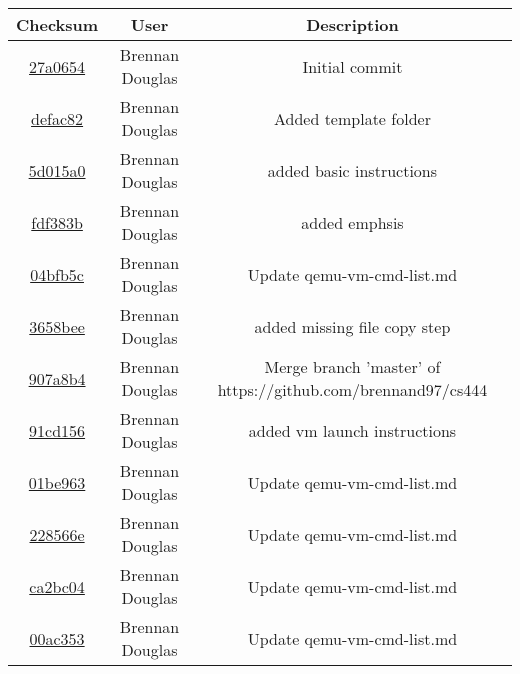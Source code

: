 \documentclass[onecolumn, draftclsnofoot,10pt, compsoc]{IEEEtran}
\begin{document}
\begin{center}
	\begin{tabular}{ |c|c|c| }
		\hline
		Checksum & User & Description \\
		\hline
        \href{https://github.com/brennand97/CS444/commit/27a06542de23be17ce0aa5bc488a6bfc0dfacba1}{27a0654} & Brennan Douglas & Initial commit\\\hline
        \href{https://github.com/brennand97/CS444/commit/defac8295b6c858a8aea01745b131ef72420058c}{defac82} & Brennan Douglas & Added template folder\\\hline
        \href{https://github.com/brennand97/CS444/commit/5d015a0995505a9367288dd4cb9d1210ec628a3e}{5d015a0} & Brennan Douglas & added basic instructions\\\hline
        \href{https://github.com/brennand97/CS444/commit/fdf383b95856bc4299a44382daf9eee220e9e109}{fdf383b} & Brennan Douglas & added emphsis\\\hline
        \href{https://github.com/brennand97/CS444/commit/04bfb5cc337bb7c092347bda650cce85dcae9182}{04bfb5c} & Brennan Douglas & Update qemu-vm-cmd-list.md\\\hline
        \href{https://github.com/brennand97/CS444/commit/3658bee9b844a88a668a33c1f1412572ce364a7b}{3658bee} & Brennan Douglas & added missing file copy step\\\hline
        \href{https://github.com/brennand97/CS444/commit/907a8b420ab1ec570664624dded37e2372de1db8}{907a8b4} & Brennan Douglas & Merge branch 'master' of https://github.com/brennand97/cs444\\\hline
        \href{https://github.com/brennand97/CS444/commit/91cd156e0dc27e1408af9b4b66c66252edba29c4}{91cd156} & Brennan Douglas & added vm launch instructions\\\hline
        \href{https://github.com/brennand97/CS444/commit/01be963b5536764397f29bdc3f4ff66158af9ff3}{01be963} & Brennan Douglas & Update qemu-vm-cmd-list.md\\\hline
        \href{https://github.com/brennand97/CS444/commit/228566e34168979b25e7764492ebe81917e80f55}{228566e} & Brennan Douglas & Update qemu-vm-cmd-list.md\\\hline
        \href{https://github.com/brennand97/CS444/commit/ca2bc04d0b4c37b58471597b684cca43a5c90f8d}{ca2bc04} & Brennan Douglas & Update qemu-vm-cmd-list.md\\\hline
        \href{https://github.com/brennand97/CS444/commit/00ac3534cadf152d3195a4420929ba8295137f64}{00ac353} & Brennan Douglas & Update qemu-vm-cmd-list.md\\\hline

\end{tabular}
\end{center}
\end{document}
